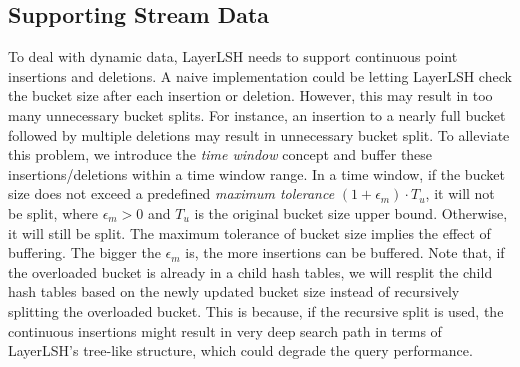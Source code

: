 \subsection{Supporting Stream Data}
\label{sec:layerlsh:stream}

To deal with dynamic data, LayerLSH needs to support continuous point insertions and deletions. A naive implementation could be letting LayerLSH check the bucket size after each insertion or deletion. However, this may result in too many unnecessary bucket splits. For instance, an insertion to a nearly full bucket followed by multiple deletions may result in unnecessary bucket split. To alleviate this problem, we introduce the \textit{time window} concept and buffer these insertions/deletions within a time window range. In a time window, if the bucket size does not exceed a predefined \textit{maximum tolerance} $(1+\epsilon_m)\cdot T_u$, it will not be split, where $\epsilon_m>0$ and $T_u$ is the original bucket size upper bound. Otherwise, it will still be split. The maximum tolerance of bucket size implies the effect of buffering. The bigger the $\epsilon_m$ is, the more insertions can be buffered. Note that, if the overloaded bucket is already in a child hash tables, we will resplit the child hash tables based on the newly updated bucket size instead of recursively splitting the overloaded bucket. This is because, if the recursive split is used, the continuous insertions might result in very deep search path in terms of LayerLSH's tree-like structure, which could degrade the query performance.


